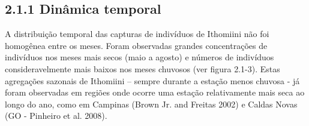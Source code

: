 \subsection{2.1.1 Dinâmica temporal} %
\label{sec:dinamica-temporal-borb}
A distribuição temporal das capturas de indivíduos de Ithomiini não foi homogênea entre os meses. Foram observadas grandes concentrações de indivíduos nos meses mais secos (maio a agosto) e números de indivíduos consideravelmente mais baixos nos meses chuvosos (ver figura 2.1-3). Estas agregações sazonais de Ithomiini – sempre durante a estação menos chuvosa - já foram observadas em regiões onde ocorre uma estação relativamente mais seca ao longo do ano, como em Campinas (Brown Jr. and Freitas 2002) e Caldas Novas (GO - Pinheiro et al. 2008). 

